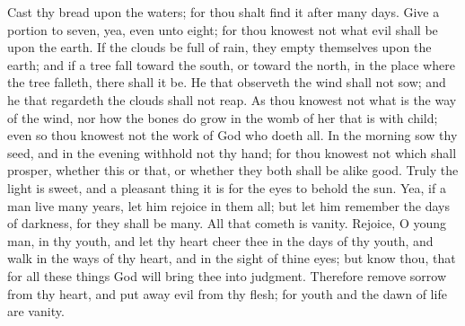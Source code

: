 Cast thy bread upon the waters; for thou shalt find it after many days. Give a portion to seven, yea, even unto eight; for thou knowest not what evil shall be upon the earth. If the clouds be full of rain, they empty themselves upon the earth; and if a tree fall toward the south, or toward the north, in the place where the tree falleth, there shall it be. He that observeth the wind shall not sow; and he that regardeth the clouds shall not reap. As thou knowest not what is the way of the wind, nor how the bones do grow in the womb of her that is with child; even so thou knowest not the work of God who doeth all. In the morning sow thy seed, and in the evening withhold not thy hand; for thou knowest not which shall prosper, whether this or that, or whether they both shall be alike good. Truly the light is sweet, and a pleasant thing it is for the eyes to behold the sun. Yea, if a man live many years, let him rejoice in them all; but let him remember the days of darkness, for they shall be many. All that cometh is vanity.  Rejoice, O young man, in thy youth, and let thy heart cheer thee in the days of thy youth, and walk in the ways of thy heart, and in the sight of thine eyes; but know thou, that for all these things God will bring thee into judgment. Therefore remove sorrow from thy heart, and put away evil from thy flesh; for youth and the dawn of life are vanity. 

